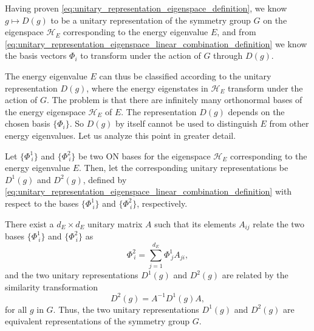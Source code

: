 Having proven \eqref{eq:unitary_representation_eigenspace_definition}, we know \(g \mapsto D(g)\) to be a unitary representation of the symmetry group \(G\) on the eigenspace \(\mathcal{H}_E\) corresponding to the energy eigenvalue \(E\), and from \eqref{eq:unitary_representation_eigenspace_linear_combination_definition} we know the basis vectors \(\Phi_i\) to transform under the action of \(G\) through \(D(g)\).

The energy eigenvalue \(E\) can thus be classified according to the unitary representation \(D(g)\), where the energy eigenstates in \(\mathcal{H}_E\) transform under the action of \(G\). The problem is that there are infinitely many orthonormal bases of the energy eigenspace \(\mathcal{H}_E\) of \(E\). The representation \(D(g)\) depends on the chosen basis \(\{\Phi_i\}\). So \(D(g)\) by itself cannot be used to distinguish \(E\) from other energy eigenvalues. Let us analyze this point in greater detail.

\begin{proposition}
    Let \(\{\Phi_{\ i}^1\}\) and \(\{\Phi_{\ i}^2\}\) be two ON bases for the eigenspace \(\mathcal{H}_E\) corresponding to the energy eigenvalue \(E\). Then, let the corresponding unitary representations be \(D^1(g)\) and \(D^2(g)\), defined by \eqref{eq:unitary_representation_eigenspace_linear_combination_definition} with respect to the bases \(\{\Phi_{\ i}^1\}\) and \(\{\Phi_{\ i}^2\}\), respectively.

    There exist a \(d_E \times d_E\) unitary matrix \(A\) such that its elements \(A_{ij}\) relate the two bases \(\{\Phi_{\ i}^1\}\) and \(\{\Phi_{\ i}^2\}\) as
    \begin{equation}
        \Phi_{\ i}^2 = \sum_{j=1}^{d_E} \Phi_{\ j}^1 A_{ji},
        \label{eq:unitary_representation_eigenspace_basis_change_definition}
    \end{equation}
    and the two unitary representations \(D^1(g)\) and \(D^2(g)\) are related by the similarity transformation
    \begin{equation}
        D^2(g) = A^{-1} D^1(g) A,
        \label{eq:unitary_representation_eigenspace_similarity_transformation_definition}
    \end{equation}
    for all \(g\) in \(G\). Thus, the two unitary representations \(D^1(g)\) and \(D^2(g)\) are equivalent representations of the symmetry group \(G\).
\end{proposition}

